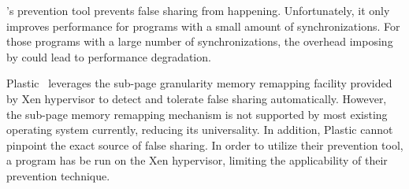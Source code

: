 \Sheriff{}'s prevention tool prevents false sharing from happening. Unfortunately, it only improves performance for programs with a small amount of synchronizations. 
For those programs with a large number of synchronizations, the overhead imposing by \Sheriff{} could lead to performance degradation.

Plastic~\cite{OSdetection} leverages the sub-page granularity memory remapping facility provided by Xen hypervisor to detect and tolerate false sharing automatically. However, the sub-page memory remapping mechanism is not supported by most existing operating system currently, reducing its universality. In addition, Plastic cannot pinpoint the exact source of false sharing.  
In order to utilize their prevention tool, a program has be run on the Xen hypervisor, limiting the applicability of their prevention technique.

